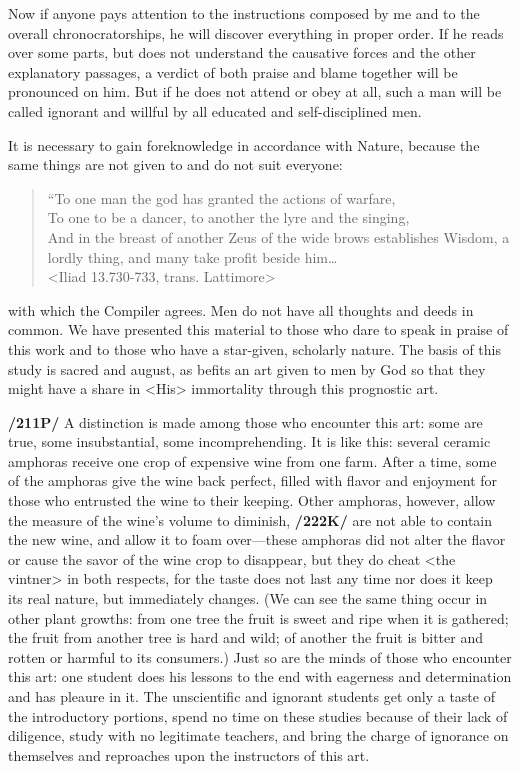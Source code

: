 Now if anyone pays attention to the instructions composed by me and to the overall chronocratorships, he will discover everything in proper order. If he reads over some parts, but does not understand the
causative forces and the other explanatory passages, a verdict of both praise and blame together will be pronounced on him. But if he does not attend or obey at all, such a man will be called ignorant and willful
by all educated and self-disciplined men.

  
It is necessary to gain foreknowledge in accordance with Nature, because the same things are not given to and do not suit everyone:
\begin{verse}
“To one man the god has granted the actions of warfare,\\
 To one to be a dancer, to another the lyre and the singing, \\
 And in the breast of another Zeus of the wide brows establishes  Wisdom, a lordly thing, and many take profit beside him…\\
 \hspace{3em}	<Iliad 13.730-733, trans. Lattimore> 
\end{verse}
with which the Compiler agrees. Men do not have all thoughts and deeds in common. We have presented this material to those who dare to speak in praise of this work and to those who have a star-given, scholarly nature. The basis of this study is sacred and august, as befits an art given to men by God so that they might have a share in <His> immortality through this prognostic art. 

\textbf{/211P/} A distinction is made among those who encounter this art: some are true, some insubstantial, some incomprehending. It is like this: several ceramic amphoras receive one crop of expensive wine from one farm. After a time, some of the amphoras give the wine back perfect, filled with flavor and enjoyment for those who entrusted the wine to their keeping. Other amphoras, however, allow the measure of the wine’s volume to diminish, \textbf{/222K/} are not able to contain the new wine, and allow it to foam over—these
amphoras did not alter the flavor or cause the savor of the wine crop to disappear, but they do cheat <the vintner> in both respects, for the taste does not last any time nor does it keep its real nature, but immediately changes. (We can see the same thing occur in other plant growths: from one tree the fruit is sweet and ripe when it is gathered; the fruit from another tree is hard and wild; of another the fruit is bitter and rotten or harmful to its consumers.) Just so are the minds of those who encounter this art: one student does his lessons to the end with eagerness and determination and has pleaure in it. The unscientific and ignorant students get only a taste of the introductory portions, spend no time on these studies because of
their lack of diligence, study with no legitimate teachers, and bring the charge of ignorance on themselves and reproaches upon the instructors of this art. 

